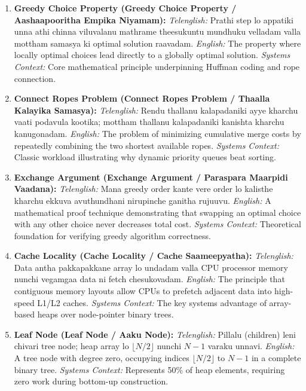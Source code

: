 \documentclass[10pt,twocolumn,letterpaper]{article}
\begin{document}
\begin{enumerate}
    \item \textbf{Greedy Choice Property (Greedy Choice Property / Aashaapooritha Empika Niyamam):}
    \textit{Telenglish:} Prathi step lo appatiki unna athi chinna viluvalanu mathrame theesukuntu mundhuku velladam valla mottham samasya ki optimal solution raavadam.
    \textit{English:} The property where locally optimal choices lead directly to a globally optimal solution.
    \textit{Systems Context:} Core mathematical principle underpinning Huffman coding and rope connection.

    \item \textbf{Connect Ropes Problem (Connect Ropes Problem / Thaalla Kalayika Samasya):}
    \textit{Telenglish:} Rendu thallanu kalapadaniki ayye kharchu vaati podavula kootika; mottham thallanu kalapadaniki kanishta kharchu kanugonadam.
    \textit{English:} The problem of minimizing cumulative merge costs by repeatedly combining the two shortest available ropes.
    \textit{Systems Context:} Classic workload illustrating why dynamic priority queues beat sorting.

    \item \textbf{Exchange Argument (Exchange Argument / Paraspara Maarpidi Vaadana):}
    \textit{Telenglish:} Mana greedy order kante vere order lo kalisthe kharchu ekkuva avuthundhani nirupinche ganitha rujuuvu.
    \textit{English:} A mathematical proof technique demonstrating that swapping an optimal choice with any other choice never decreases total cost.
    \textit{Systems Context:} Theoretical foundation for verifying greedy algorithm correctness.

    \item \textbf{Cache Locality (Cache Locality / Cache Saameepyatha):}
    \textit{Telenglish:} Data antha pakkapakkane array lo undadam valla CPU processor memory nunchi vegamgaa data ni fetch chesukovadam.
    \textit{English:} The principle that contiguous memory layouts allow CPUs to prefetch adjacent data into high-speed L1/L2 caches.
    \textit{Systems Context:} The key systems advantage of array-based heaps over node-pointer binary trees.

    \item \textbf{Leaf Node (Leaf Node / Aaku Node):}
    \textit{Telenglish:} Pillalu (children) leni chivari tree node; heap array lo $\lfloor N/2 \rfloor$ nunchi $N-1$ varaku unnavi.
    \textit{English:} A tree node with degree zero, occupying indices $\lfloor N/2 \rfloor$ to $N-1$ in a complete binary tree.
    \textit{Systems Context:} Represents 50\% of heap elements, requiring zero work during bottom-up construction.


\end{enumerate}
\end{document}
